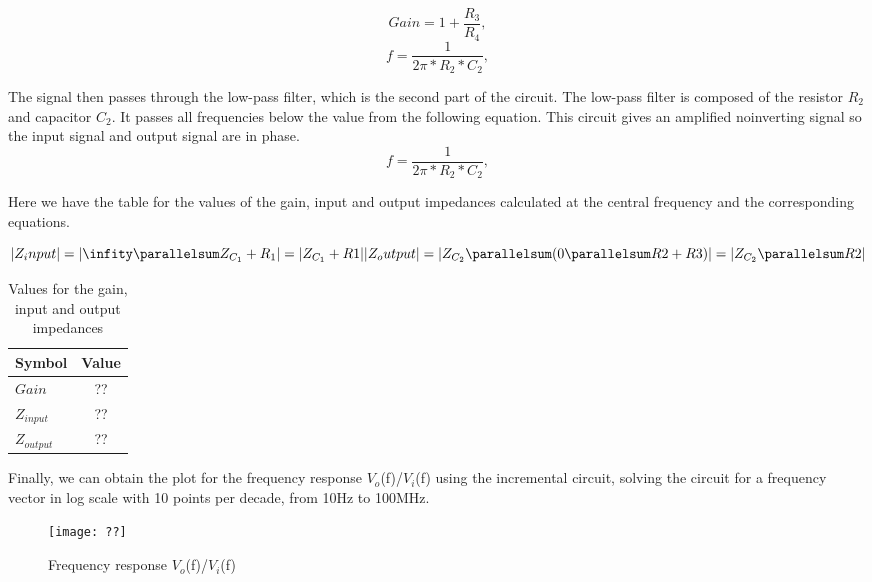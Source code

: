 \begin{equation}
  Gain = 1+ \frac{R_3}{R_4},
  \label{eq:gain}
\end{equation}
\begin{equation}
  {f} = \frac{1}{2\pi*R_2*C_2},
  \label{eq:f1}
\end{equation}

The signal then passes through the low-pass filter, which is the second part of the circuit. The low-pass filter is composed of the resistor $R_2$ and capacitor $C_2$. It passes all frequencies below the value from the following equation. This circuit gives an amplified noinverting signal so the input signal and output signal are in phase.
\begin{equation}
  {f} = \frac{1}{2\pi*R_2*C_2},
  \label{eq:f2}
\end{equation}



Here we have the table for the values of the gain, input and output impedances calculated at the central frequency and the corresponding equations. 


\begin{equation}
|Z_input| = |\infity \parallelsum Z_{C_1} + R_1| = |Z_{C_1} + R1|\\
|Z_output| = |Z_{C_2} \parallelsum (0 \parallelsum R2 + R3)| = |Z_{C_2} \parallelsum R2|\\
\label{eq:impendances}
\end{equation}

\begin{table}[h]
    \centering
    \begin{tabular}{|l|c|}
    \hline
    {\bf Symbol} & {\bf Value} \\ \hline
    $Gain$ & ?? \\ \hline
    $Z_{input}$ & ?? \\ \hline
    $Z_{output}$ & ??  \\ \hline

    \end{tabular}
    \caption{Values for the gain, input and output impedances}
    \label{tab:valuesimp}
\end{table}

Finally, we can obtain the plot for the frequency response $V_o$(f)/$V_i$(f) using the incremental circuit, solving the circuit for a frequency vector in log scale with 10 points per decade, from 10Hz to 100MHz.

\begin{figure}[!ht] \centering
\caption{Frequency response $V_o$(f)/$V_i$(f)}
\squeezeup  
\texttt{[image: ??]}
\label{fig:theoretical}
\end{figure}


  





